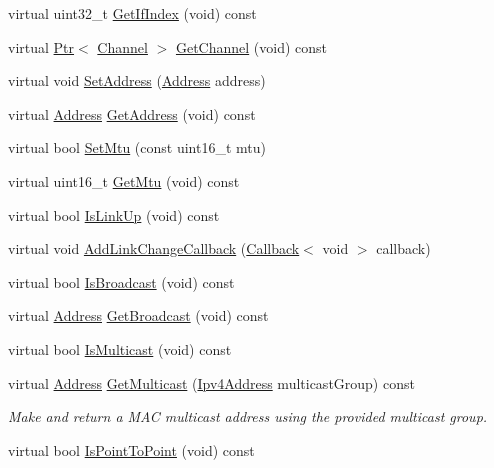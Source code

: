 \begin{DoxyCompactItemize}
\item 
virtual uint32\+\_\+t \hyperlink{classns3_1_1TapBridge_ae7688d83bd817150755e48c8207b5633}{Get\+If\+Index} (void) const 
\item 
virtual \hyperlink{classns3_1_1Ptr}{Ptr}$<$ \hyperlink{classns3_1_1Channel}{Channel} $>$ \hyperlink{classns3_1_1TapBridge_a2db1411e39ca9653ddcccc3000862ab1}{Get\+Channel} (void) const 
\item 
virtual void \hyperlink{classns3_1_1TapBridge_a3d3f981cb1ace70ecfa34744108ff2b7}{Set\+Address} (\hyperlink{classns3_1_1Address}{Address} address)
\item 
virtual \hyperlink{classns3_1_1Address}{Address} \hyperlink{classns3_1_1TapBridge_adad791a296c4d4015a6d2e2d022b6a63}{Get\+Address} (void) const 
\item 
virtual bool \hyperlink{classns3_1_1TapBridge_af41aca6484197a8a139b8db0fbcb6b79}{Set\+Mtu} (const uint16\+\_\+t mtu)
\item 
virtual uint16\+\_\+t \hyperlink{classns3_1_1TapBridge_a9c10575ce501dfa92da9f45b32891407}{Get\+Mtu} (void) const 
\item 
virtual bool \hyperlink{classns3_1_1TapBridge_a3d8af7dbe31c534dec551c38f2f66afa}{Is\+Link\+Up} (void) const 
\item 
virtual void \hyperlink{classns3_1_1TapBridge_a3f2e72b395d83fff19e5f3a09298aef3}{Add\+Link\+Change\+Callback} (\hyperlink{classns3_1_1Callback}{Callback}$<$ void $>$ callback)
\item 
virtual bool \hyperlink{classns3_1_1TapBridge_aae97d70b414626bf3662a3916ff9b64e}{Is\+Broadcast} (void) const 
\item 
virtual \hyperlink{classns3_1_1Address}{Address} \hyperlink{classns3_1_1TapBridge_ab0c6b045924ddf43fb33c2dc79581923}{Get\+Broadcast} (void) const 
\item 
virtual bool \hyperlink{classns3_1_1TapBridge_a08b9d57e3a6a50f224ea517d241f3ee8}{Is\+Multicast} (void) const 
\item 
virtual \hyperlink{classns3_1_1Address}{Address} \hyperlink{classns3_1_1TapBridge_a76c7ce4e8ba5177450b62e386d2aeddf}{Get\+Multicast} (\hyperlink{classns3_1_1Ipv4Address}{Ipv4\+Address} multicast\+Group) const 
\begin{DoxyCompactList}\small\item\em Make and return a M\+AC multicast address using the provided multicast group. \end{DoxyCompactList}\item 
virtual bool \hyperlink{classns3_1_1TapBridge_a6e884e1a4e268402f183e35953458d4a}{Is\+Point\+To\+Point} (void) const 

\end{DoxyCompactItemize}
